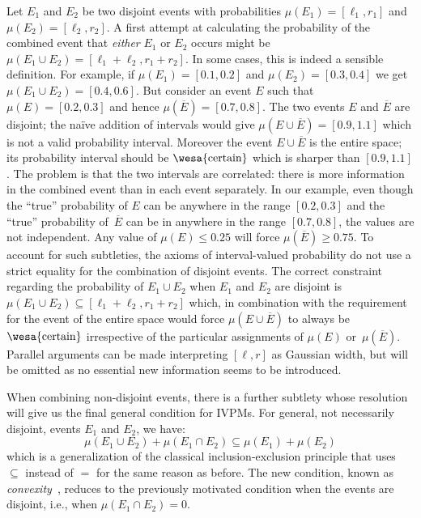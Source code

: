 \documentclass[english,reprint, aps, prl,superscriptaddress, showpacs,
showkeys, longbibliography, amsmath, amssymb, floatfix]{revtex4-1}
\theoremstyle{plain}
\theoremstyle{definition}
\newcommand{\necess}{{\text{\wesa{certain}}}}
\begin{document}
Let $E_1$ and $E_2$ be two disjoint events with probabilities
$\mu(E_1)=[\ell_1,r_1]$ and $\mu(E_2)=[\ell_2,r_2]$. A first attempt
at calculating the probability of the combined event that
\emph{either} $E_1$ or $E_2$ occurs might be
$\mu(E_1\cup E_2) = [\ell_1+\ell_2,r_1+r_2]$. In some cases, this is
indeed a sensible definition. For example, if $\mu(E_1)=[0.1,0.2]$ and
$\mu(E_2)=[0.3,0.4]$ we get $\mu(E_1\cup E_2) = [0.4,0.6]$. But
consider an event $E$ such that $\mu(E)=[0.2,0.3]$ and hence
$\mu(\overline{E})=[0.7,0.8]$. The two events $E$ and $\overline{E}$
are disjoint; the naïve addition of intervals would give
$\mu(E\cup\overline{E})=[0.9,1.1]$ which is not a valid probability
interval. Moreover the event $E\cup\overline{E}$ is the
entire space; its probability interval should be
$\necess$ which is sharper than $[0.9,1.1]$. The problem is that the
two intervals are correlated: there is more information in the
combined event than in each event separately. In our example, even
though the ``true'' probability of $E$ can be anywhere in the range
$[0.2,0.3]$ and the ``true'' probability of~$\overline{E}$ can be in
anywhere in the range $[0.7,0.8]$, the values are not independent. Any
value of $\mu(E) \leq 0.25$ will force $\mu(\overline{E})\geq
0.75$. To account for such subtleties, the axioms of interval-valued
probability do not use a strict equality for the combination of
disjoint events. The correct constraint regarding the probability of
$E_1\cup E_2$ when $E_1$ and $E_2$ are disjoint is
$\mu(E_1\cup E_2) \subseteq [\ell_1+\ell_2,r_1+r_2]$ which, in
combination with the requirement for the event of the entire space would force
$\mu(E \cup \overline{E})$ to always be $\necess$ irrespective of the
particular assignments of $\mu(E)$ or~$\mu(\overline{E})$. Parallel arguments
can be made interpreting $[\ell,r]$ as Gaussian width, but will be omitted as no
essential new information seems to be introduced.

When combining non-disjoint events, there is a further subtlety whose
resolution will give us the final general condition for IVPMs. For
general, not necessarily disjoint, events $E_1$ and $E_2$, we have:
\begin{equation}
\mu(E_1\cup E_2) + \mu(E_1\cap E_2) \subseteq \mu(E_1) + \mu(E_2)
\label{eq:classicalconvex}
\end{equation}
which is a generalization of the classical inclusion-exclusion
principle that uses $\subseteq$ instead of $=$ for the same reason as
before. The new condition, known as
\emph{convexity}~\cite{Shapley1971,GilboaSchmeidler1994,Marinacci1999,Grabisch2016},
reduces to the previously
motivated condition when the events are disjoint, i.e., when
$\mu(E_1\cap E_2) = 0$.
\end{document}
